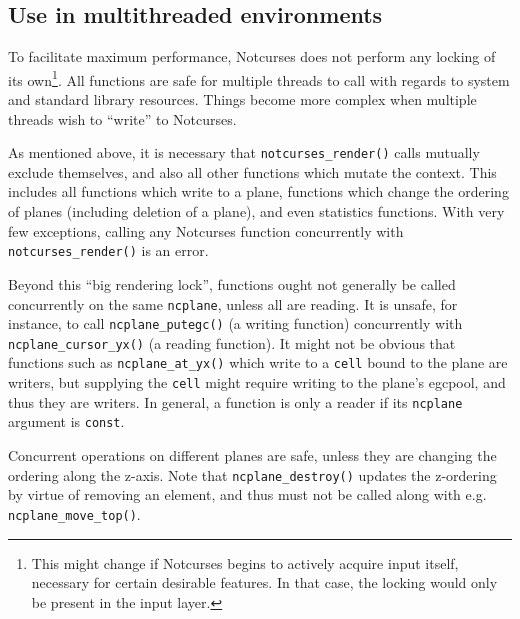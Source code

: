 \documentclass[letterpaper,10pt]{article}
\begin{document}
\subsection{Use in multithreaded environments}
\label{sec:fullthreads}
To facilitate maximum performance, Notcurses does not perform any locking of
its own\footnote{This might change if Notcurses begins to actively acquire
input itself, necessary for certain desirable features. In that case, the
locking would only be present in the input layer.}. All functions are safe
for multiple threads to call with regards to system and standard library
resources. Things become more complex when multiple threads wish to ``write''
to Notcurses.

As mentioned above, it is necessary that \texttt{notcurses\_render()} calls
mutually exclude themselves, and also all other functions which mutate the
context. This includes all functions which write to a plane, functions which
change the ordering of planes (including deletion of a plane), and even
statistics functions. With very few exceptions, calling any Notcurses function
concurrently with \texttt{notcurses\_render()} is an error.

Beyond this ``big rendering lock'', functions ought not generally be called
concurrently on the same \texttt{ncplane}, unless all are reading. It is
unsafe, for instance, to call \texttt{ncplane\_putegc()} (a writing function)
concurrently with \texttt{ncplane\_cursor\_yx()} (a reading function). It
might not be obvious that functions such as \texttt{ncplane\_at\_yx()} which
write to a \texttt{cell} bound to the plane are writers, but supplying the
\texttt{cell} might require writing to the plane's egcpool, and thus they are
writers. In general, a function is only a reader if its \texttt{ncplane} argument
is \texttt{const}.

Concurrent operations on different planes are safe, unless they are changing
the ordering along the z-axis. Note that \texttt{ncplane\_destroy()} updates
the z-ordering by virtue of removing an element, and thus must not be called
along with e.g. \texttt{ncplane\_move\_top()}.

\cleardoublepage


\pagebreak
\cleardoublepage

\pagebreak
\cleardoublepage
\end{document}
